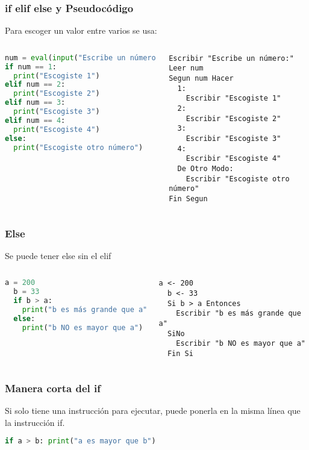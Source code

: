 \begin{frame}[fragile]
  \frametitle{if elif else y Pseudocódigo}

  Para escoger un valor entre varios se usa:
  \begin{columns}
      \begin{lstlisting}[language=Python]
num = eval(input("Escribe un número:"))
if num == 1:
  print("Escogiste 1")
elif num == 2:
  print("Escogiste 2")
elif num == 3:
  print("Escogiste 3")
elif num == 4:
  print("Escogiste 4")
else:
  print("Escogiste otro número")\end{lstlisting}
    \pausa
      \begin{lstlisting}[style=pseudocodigo]
Escribir "Escribe un número:"
Leer num
Segun num Hacer
  1:
    Escribir "Escogiste 1"
  2:
    Escribir "Escogiste 2"
  3:
    Escribir "Escogiste 3"
  4:
    Escribir "Escogiste 4"
  De Otro Modo:
    Escribir "Escogiste otro número"
Fin Segun\end{lstlisting}
  \end{columns}
\end{frame}

\begin{frame}[fragile]
  \frametitle{Else}

  Se puede tener \textcolor{codeKeyword}{else} sin el
  \textcolor{codeKeyword}{elif}

  \begin{columns}
      \begin{lstlisting}[language=Python]
  a = 200
  b = 33
  if b > a:
    print("b es más grande que a")
  else:
    print("b NO es mayor que a")
      \end{lstlisting}
    \pausa
      \begin{lstlisting}[style=pseudocodigo]
  a <- 200
  b <- 33
  Si b > a Entonces
    Escribir "b es más grande que a"
  SiNo
    Escribir "b NO es mayor que a"
  Fin Si
      \end{lstlisting}
  \end{columns}
\end{frame}

\begin{frame}[fragile]
  \frametitle{Manera corta del if}

  Si solo tiene una instrucción para ejecutar, puede ponerla en la misma
  línea que la instrucción if.

  \vspace{\baselineskip}
  \begin{lstlisting}[language=Python]
  if a > b: print("a es mayor que b")
  \end{lstlisting}
\end{frame}

